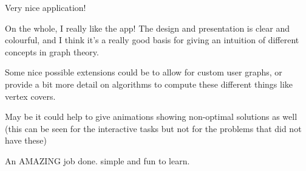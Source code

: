 Very nice application!

On the whole, I really like the app! The design and presentation is clear
and colourful, and I think it's a really good basis for giving an
intuition of different concepts in graph theory. 

Some nice possible extensions could be to allow for custom user graphs,
or provide a bit more detail on algorithms to compute these different
things like vertex covers.


May be it could help to give animations showing non-optimal solutions as
well (this can be seen for the interactive tasks but not for the problems
that did not have these)

An AMAZING job done. simple and fun to learn.
